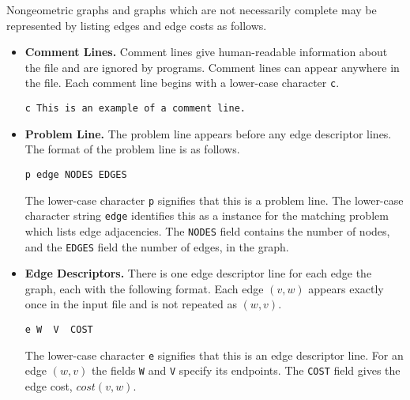 Nongeometric graphs and graphs which are not necessarily complete 
may be represented by listing edges and edge costs as follows.  

\begin{itemize}
\item {\bf Comment Lines.} Comment lines give human-readable information
about the file and are ignored by programs. Comment lines 
can appear anywhere in the file. 
Each comment line begins with a lower-case character {\tt c}.  
\begin{verbatim}
c This is an example of a comment line. 
\end{verbatim} 

\item {\bf Problem Line.} The problem line appears before any 
edge descriptor lines.  The format of the problem line is as
follows.
\begin{verbatim}
p edge NODES EDGES
\end{verbatim}
The lower-case character {\tt p} signifies that this is a  problem line. 
The lower-case character string {\tt edge} identifies this as a
instance for the matching problem which lists edge adjacencies. 
The {\tt NODES} field contains the number of nodes, and the
{\tt EDGES} field the number of edges, in the graph. 

\item {\bf Edge Descriptors.} There is one edge descriptor
line for each edge the graph, each with the following format.  Each 
edge $(v,w)$ appears exactly once in the
input file and is not repeated as $(w,v)$. 

\begin{verbatim}
e W  V  COST
\end{verbatim} 
The lower-case character {\tt e} signifies that this is an 
edge descriptor line.  For an edge $(w,v)$ the fields {\tt W}  and 
{\tt V} specify its endpoints.  The {\tt COST} field gives the 
edge cost, $cost(v,w)$. 
\end{itemize}

